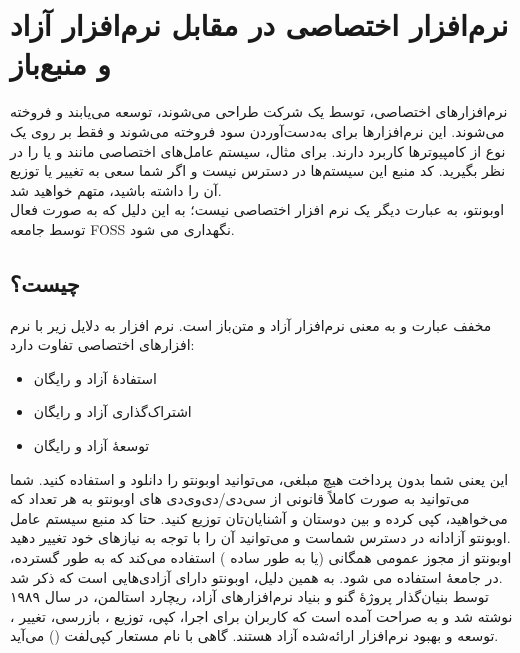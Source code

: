 \section{نرم‌افزار اختصاصی در مقابل نرم‌افزار آزاد و منبع‌باز}
نرم‌افزارهای اختصاصی، توسط یک شرکت طراحی می‌شوند، توسعه می‌یابند و فروخته می‌شوند. این نرم‌افزارها برای به‌دست‌آوردن سود فروخته می‌شوند و فقط بر روی یک نوع از کامپیوترها کاربرد دارند. برای مثال، سیستم عامل‌های اختصاصی مانند  و یا  را در نظر بگیرید. کد منبع این سیستم‌ها در دسترس نیست و اگر شما سعی به تغییر یا توزیع آن را داشته باشید، متهم خواهید شد.\\
اوبونتو، به عبارت دیگر یک نرم افزار اختصاصی نیست؛ به این دلیل که به صورت فعال توسط جامعه FOSS نگهداری می شود.

\subsection*{ چیست؟}
 مخفف عبارت  و به معنی نرم‌افزار آزاد و متن‌باز است. نرم افزار  به دلایل زیر با نرم افزارهای اختصاصی تفاوت دارد:

\begin{itemize}
\item استفادهٔ آزاد و رایگان
\item اشتراک‌گذاری آزاد و رایگان
\item توسعهٔ آزاد و رایگان
\end{itemize}

این یعنی شما بدون پرداخت هیچ مبلغی، می‌توانید اوبونتو را دانلود و استفاده کنید. شما می‌توانید به صورت کاملاً قانونی از سی‌دی/دی‌وی‌دی های اوبونتو به هر تعداد که می‌خواهید، کپی کرده و بین دوستان و آشنایان‌تان توزیع کنید. حتا کد منبع سیستم عامل اوبونتو آزادانه در دسترس شماست و می‌توانید آن را با توجه به نیازهای خود تغییر دهید.\\
اوبونتو از مجوز عمومی همگانی   (یا به طور ساده ) استفاده می‌کند که به طور گسترده، در جامعهٔ  استفاده می شود. به همین دلیل، اوبونتو دارای آزادی‌هایی است که ذکر شد.\\
 توسط بنیان‌گذار پروژهٔ گنو و بنیاد نرم‌افزارهای آزاد، ریچارد استالمن، در سال ۱۹۸۹ نوشته شد و به صراحت آمده است که کاربران برای اجرا، کپی، توزیع ، بازرسی، تغییر ، توسعه و بهبود نرم‌افزار ارائه‌شده آزاد هستند. گاهی  با  نام مستعار کپی‌لفت () می‌آید.

